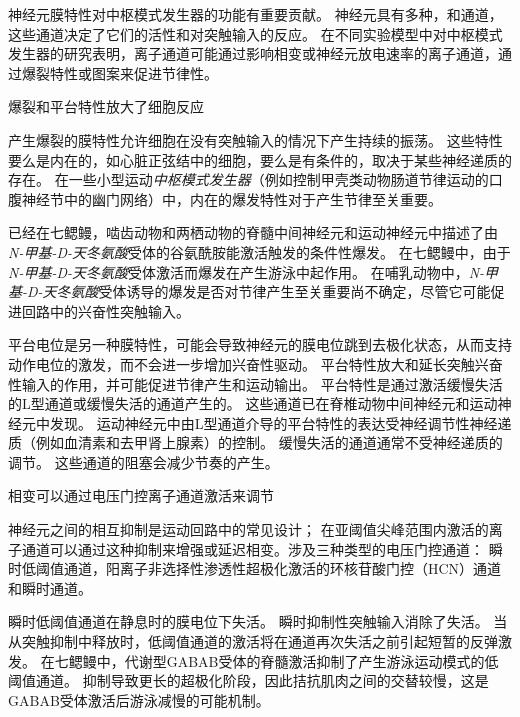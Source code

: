 \begin{proposition}[神经元离子通道有助于中枢模式发生器功能] \label{box:33_2}
	
	\quad \quad 神经元膜特性对中枢模式发生器的功能有重要贡献。
	神经元具有多种，和通道，这些通道决定了它们的活性和对突触输入的反应。
	在不同实验模型中对中枢模式发生器的研究表明，离子通道可能通过影响相变或神经元放电速率的离子通道，通过爆裂特性或图案来促进节律性。
	
	\quad \quad 爆裂和平台特性放大了细胞反应
	
	\quad \quad 产生爆裂的膜特性允许细胞在没有突触输入的情况下产生持续的振荡。
	这些特性要么是内在的，如心脏正弦结中的细胞，要么是有条件的，取决于某些神经递质的存在。
	在一些小型运动\textit{中枢模式发生器}（例如控制甲壳类动物肠道节律运动的口腹神经节中的幽门网络）中，内在的爆发特性对于产生节律至关重要。
	
	\quad \quad 已经在七鳃鳗，啮齿动物和两栖动物的脊髓中间神经元和运动神经元中描述了由\textit{N-甲基-D-天冬氨酸}受体的谷氨酰胺能激活触发的条件性爆发。
	在七鳃鳗中，由于\textit{N-甲基-D-天冬氨酸}受体激活而爆发在产生游泳中起作用。
	在哺乳动物中，\textit{N-甲基-D-天冬氨酸}受体诱导的爆发是否对节律产生至关重要尚不确定，尽管它可能促进回路中的兴奋性突触输入。
	
	\quad \quad 平台电位是另一种膜特性，可能会导致神经元的膜电位跳到去极化状态，从而支持动作电位的激发，而不会进一步增加兴奋性驱动。
	平台特性放大和延长突触兴奋性输入的作用，并可能促进节律产生和运动输出。
	平台特性是通过激活缓慢失活的L型通道或缓慢失活的通道产生的。
	这些通道已在脊椎动物中间神经元和运动神经元中发现。
	运动神经元中由L型通道介导的平台特性的表达受神经调节性神经递质（例如血清素和去甲肾上腺素）的控制。
	缓慢失活的通道通常不受神经递质的调节。
	这些通道的阻塞会减少节奏的产生。
	
	\quad \quad 相变可以通过电压门控离子通道激活来调节
	
	\quad \quad 神经元之间的相互抑制是运动回路中的常见设计；
	在亚阈值尖峰范围内激活的离子通道可以通过这种抑制来增强或延迟相变。涉及三种类型的电压门控通道：
	瞬时低阈值通道，阳离子非选择性渗透性超极化激活的环核苷酸门控（HCN）通道和瞬时通道。
	
	\quad \quad 瞬时低阈值通道在静息时的膜电位下失活。
	瞬时抑制性突触输入消除了失活。
	当从突触抑制中释放时，低阈值通道的激活将在通道再次失活之前引起短暂的反弹激发。
	在七鳃鳗中，代谢型GABAB受体的脊髓激活抑制了产生游泳运动模式的低阈值通道。
	抑制导致更长的超极化阶段，因此拮抗肌肉之间的交替较慢，这是GABAB受体激活后游泳减慢的可能机制。
	

\end{proposition}
